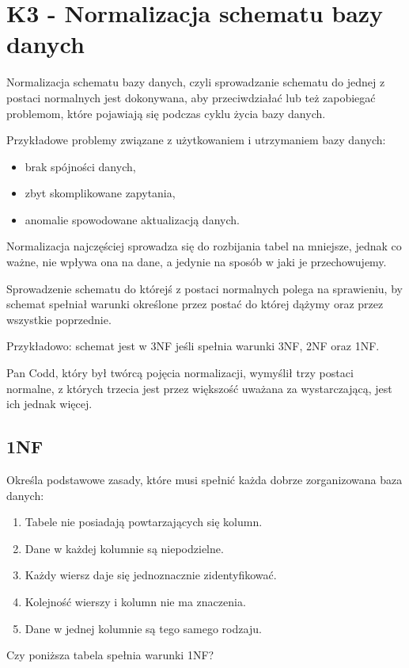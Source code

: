 \section{K3 - Normalizacja schematu bazy danych}

Normalizacja schematu bazy danych, czyli sprowadzanie schematu do jednej z postaci normalnych jest dokonywana, aby przeciwdziałać lub też zapobiegać problemom, które pojawiają się podczas cyklu życia bazy danych.

Przykładowe problemy związane z użytkowaniem i utrzymaniem bazy danych:
\begin{itemize}
	\item{brak spójności danych,}
	\item{zbyt skomplikowane zapytania,}
	\item{anomalie spowodowane aktualizacją danych.}
\end{itemize}

Normalizacja najczęściej sprowadza się do rozbijania tabel na mniejsze, jednak co ważne, nie wpływa ona na dane, a jedynie na sposób w jaki je przechowujemy.

Sprowadzenie schematu do którejś z postaci normalnych polega na sprawieniu, by schemat spełniał warunki określone przez postać do której dążymy oraz przez wszystkie poprzednie.

Przykładowo: schemat jest w 3NF jeśli spełnia warunki 3NF, 2NF oraz 1NF.

Pan Codd, który był twórcą pojęcia normalizacji, wymyślił trzy postaci normalne, z których trzecia jest przez większość uważana za wystarczającą, jest ich jednak więcej.
\subsection*{1NF}
	Określa podstawowe zasady, które musi spełnić każda dobrze zorganizowana baza danych:
\begin{enumerate}
	\item{Tabele nie posiadają powtarzających się kolumn.}
	\item{Dane w każdej kolumnie są niepodzielne.}
	\item{Każdy wiersz daje się jednoznacznie zidentyfikować.}
	\item{Kolejność wierszy i kolumn nie ma znaczenia.}
	\item{Dane w jednej kolumnie są tego samego rodzaju.}
\end{enumerate}

Czy poniższa tabela spełnia warunki 1NF?

